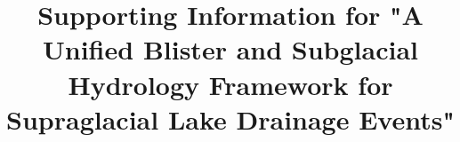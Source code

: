 \documentclass[draft,jgrga]{agutexSI2019}
\begin{document}
\title{Supporting Information for "A Unified Blister and Subglacial Hydrology Framework for Supraglacial Lake Drainage Events"}



\newtheorem{lemma}{Lemma} 
\newtheorem{corollary}{Corollary}
\newcommand{\Grad}{\boldsymbol{\nabla}}
\newcommand{\Div}{\Grad\cdot}
\newcommand{\Curl}{\Grad\times}
\newcommand{\pdiff}[2]{\frac{\partial{#1}}{\partial{#2}}}
\newcommand{\diff}[2]{\frac{\text{d}{#1}}{\text{d}{#2}}}
\newcommand{\difftwo}[2]{\frac{\text{d}^2{#1}}{\text{d}{#2}^2}}
\newcommand{\pdifftwo}[2]{\frac{\partial^2{#1}}{\partial{#2}^2}}
\newcommand{\vel}{\boldsymbol{v}}
\newcommand{\Vel}{\boldsymbol{V}}
\newcommand{\bvec}[1]{\hat{\boldsymbol{#1}}}
\newcommand{\eye}{\boldsymbol{I}}
\newcommand{\DV}[1]{\boldsymbol{D}\left({#1}\right)}
\newcommand{\gravity}{\boldsymbol{g}}
\newcommand{\eq}[1]{{#1}^{eq}}
\newcommand{\xdiff}[2]{{#1}^{\left({#2}\right)}}
\newcommand{\scale}[1]{\left[{#1}\right]}
\newcommand{\zeroth}{^{(0)}}
\newcommand{\first}{^{(1)}}
\newcommand{\order}[1]{\mathcal{O}\left(\omega^{#1}\right)}
\newcommand{\RNum}[1]{\uppercase\expandafter{\romannumeral #1\relax}}
\newcommand{\secref}[1]{Section.\ref{#1}}
\newcommand{\figref}[1]{Figure.\ref{#1}}
\newcommand{\tabref}[1]{Table.\ref{#1}}
\newcommand{\appref}[1]{Appendix.\ref{#1}}
\newcommand{\eqnref}[1]{Equation.\ref{#1}}
\end{document}
